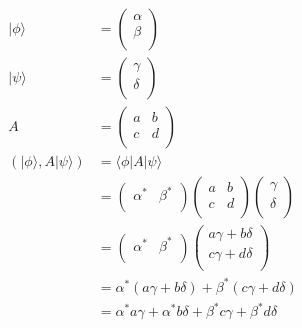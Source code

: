 \documentclass{article}
\begin{document}
\begin{equation}
    \begin{split}
        |\phi\rangle & = \begin{pmatrix}
            \alpha \\
            \beta \\
        \end{pmatrix} \\
        |\psi\rangle & = \begin{pmatrix}
            \gamma \\
            \delta \\
        \end{pmatrix} \\
        A & = \begin{pmatrix}
            a & b \\
            c & d \\
        \end{pmatrix} \\
        (|\phi\rangle, A|\psi\rangle) & = \langle\phi|A|\psi\rangle \\
        & = \begin{pmatrix}
            \alpha^* & \beta^* \\
        \end{pmatrix} \begin{pmatrix}
            a & b \\
            c & d \\
        \end{pmatrix} \begin{pmatrix}
            \gamma \\
            \delta \\
        \end{pmatrix} \\
        & = \begin{pmatrix}
            \alpha^* & \beta^* \\
        \end{pmatrix} \begin{pmatrix}
            a\gamma + b\delta \\
            c\gamma + d\delta \\
        \end{pmatrix} \\
        & = \alpha^*(a\gamma + b\delta) + \beta^*(c\gamma + d\delta) \\
        & = \alpha^*a\gamma + \alpha^*b\delta + \beta^*c\gamma + \beta^*d\delta \\
    \end{split}
\end{equation}
\end{document}
